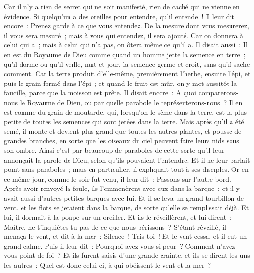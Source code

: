 \begin{multicols}{2}
Car il n'y a rien de secret qui ne soit manifesté, rien de caché qui ne vienne en évidence.
Si quelqu'un a des oreilles pour entendre, qu'il entende~!
Il leur dit encore~: Prenez garde à ce que vous entendez. De la mesure dont vous mesurerez, il vous sera mesuré~; mais à vous qui entendez, il sera ajouté.
Car on donnera à celui qui a~; mais à celui qui n'a pas, on ôtera même ce qu'il a.
Il disait aussi~: Il en est du Royaume de Dieu comme quand un homme jette la semence en terre~;
qu'il dorme ou qu'il veille, nuit et jour, la semence germe et croît, sans qu'il sache comment.
Car la terre produit d'elle-même, premièrement l'herbe, ensuite l'épi, et puis le grain formé dans l'épi~;
et quand le fruit est mûr, on y met aussitôt la faucille, parce que la moisson est prête.
Il disait encore~: A quoi comparerons-nous le Royaume de Dieu, ou par quelle parabole le représenterons-nous~?
Il en est comme du grain de moutarde, qui, lorsqu'on le sème dans la terre, est la plus petite de toutes les semences qui sont jetées dans la terre.
Mais après qu'il a été semé, il monte et devient plus grand que toutes les autres plantes, et pousse de grandes branches, en sorte que les oiseaux du ciel peuvent faire leurs nids sous son ombre.
Ainsi c'est par beaucoup de paraboles de cette sorte qu'il leur annonçait la parole de Dieu, selon qu'ils pouvaient l'entendre.
Et il ne leur parlait point sans paraboles~; mais en particulier, il expliquait tout à ses disciples.
Or en ce même jour, comme le soir fut venu, il leur dit~: Passons sur l'autre bord.
Après avoir renvoyé la foule, ils l'emmenèrent avec eux dans la barque~; et il y avait aussi d'autres petites barques avec lui.
Et il se leva un grand tourbillon de vent, et les flots se jetaient dans la barque, de sorte qu'elle se remplissait déjà.
Et lui, il dormait à la poupe sur un oreiller. Et ils le réveillèrent, et lui dirent~: Maître, ne t'inquiètes-tu pas de ce que nous périssons~?
S'étant réveillé, il menaça le vent, et dit à la mer~: Silence~! Tais-toi~! Et le vent cessa, et il eut un grand calme.
Puis il leur dit~: Pourquoi avez-vous si peur~? Comment n'avez-vous point de foi~?
Et ils furent saisis d'une grande crainte, et ils se dirent les uns les autres~: Quel est donc celui-ci, à qui obéissent le vent et la mer~?

\end{multicols}
